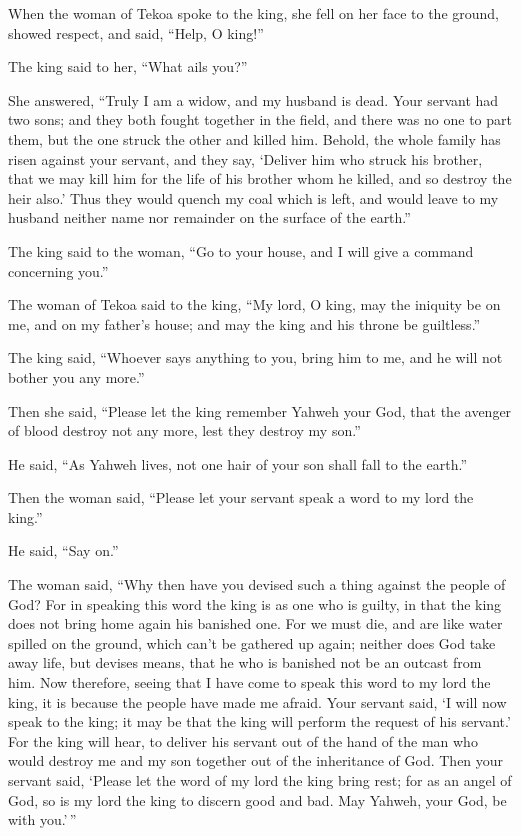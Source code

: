  When the woman of Tekoa spoke to the king, she fell on her
face to the ground, showed respect, and said, ``Help, O king!''

 The king said to her, ``What ails you?''

She answered, ``Truly I am a widow, and my husband is dead. 
Your servant had two sons; and they both fought together in the field,
and there was no one to part them, but the one struck the other and
killed him.  Behold, the whole family has risen against your
servant, and they say, `Deliver him who struck his brother, that we may
kill him for the life of his brother whom he killed, and so destroy the
heir also.' Thus they would quench my coal which is left, and would
leave to my husband neither name nor remainder on the surface of the
earth.''

 The king said to the woman, ``Go to your house, and I will
give a command concerning you.''

 The woman of Tekoa said to the king, ``My lord, O king, may
the iniquity be on me, and on my father's house; and may the king and
his throne be guiltless.''

 The king said, ``Whoever says anything to you, bring him
to me, and he will not bother you any more.''

 Then she said, ``Please let the king remember Yahweh your
God, that the avenger of blood destroy not any more, lest they destroy
my son.''

He said, ``As Yahweh lives, not one hair of your son shall fall to the
earth.''

 Then the woman said, ``Please let your servant speak a
word to my lord the king.''

He said, ``Say on.''

 The woman said, ``Why then have you devised such a thing
against the people of God? For in speaking this word the king is as one
who is guilty, in that the king does not bring home again his banished
one.  For we must die, and are like water spilled on the
ground, which can't be gathered up again; neither does God take away
life, but devises means, that he who is banished not be an outcast from
him.  Now therefore, seeing that I have come to speak this
word to my lord the king, it is because the people have made me afraid.
Your servant said, `I will now speak to the king; it may be that the
king will perform the request of his servant.'  For the
king will hear, to deliver his servant out of the hand of the man who
would destroy me and my son together out of the inheritance of God.
 Then your servant said, `Please let the word of my lord
the king bring rest; for as an angel of God, so is my lord the king to
discern good and bad. May Yahweh, your God, be with you.'\,''

